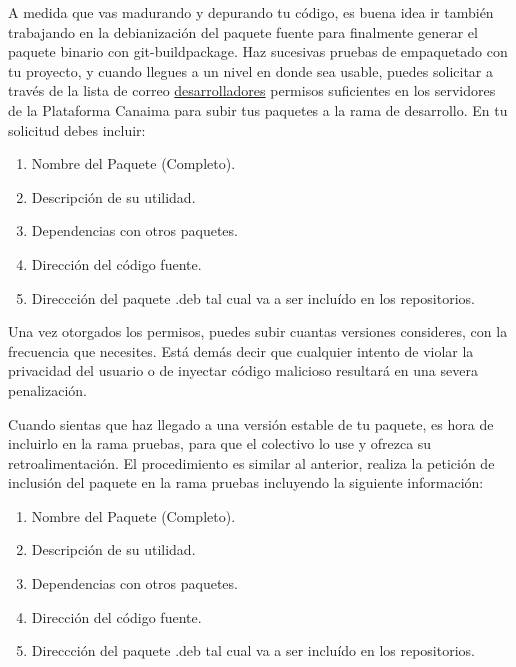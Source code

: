\documentclass[letterpaper,12pt,spanish]{manual}
\begin{document}
A medida que vas madurando y depurando tu código, es buena idea ir también trabajando en la debianización del paquete fuente para finalmente generar el paquete binario con git-buildpackage.  Haz sucesivas pruebas de empaquetado con tu proyecto, y cuando llegues a un nivel en donde sea usable, puedes solicitar a través de la lista de correo \href{http://listas.canaima.softwarelibre.gob.ve/cgi-bin/mailman/listinfo/desarrolladores}{desarrolladores} permisos suficientes en los servidores de la Plataforma Canaima para subir tus paquetes a la rama de desarrollo. En tu solicitud debes incluir:
\begin{enumerate}
\item {} 
Nombre del Paquete (Completo).

\item {} 
Descripción de su utilidad.

\item {} 
Dependencias con otros paquetes.

\item {} 
Dirección del código fuente.

\item {} 
Direccción del paquete .deb tal cual va a ser incluído en los repositorios.

\end{enumerate}

Una vez otorgados los permisos, puedes subir cuantas versiones consideres, con la frecuencia que necesites. Está demás decir que cualquier intento de violar la privacidad del usuario o de inyectar código malicioso resultará en una severa penalización.

Cuando sientas que haz llegado a una versión estable de tu paquete, es hora de incluirlo en la rama pruebas, para que el colectivo lo use y ofrezca su retroalimentación. El procedimiento es similar al anterior, realiza la petición de inclusión del paquete en la rama pruebas incluyendo la siguiente información:
\begin{enumerate}
\item {} 
Nombre del Paquete (Completo).

\item {} 
Descripción de su utilidad.

\item {} 
Dependencias con otros paquetes.

\item {} 
Dirección del código fuente.

\item {} 
Direccción del paquete .deb tal cual va a ser incluído en los repositorios.

\end{enumerate}
\end{document}
